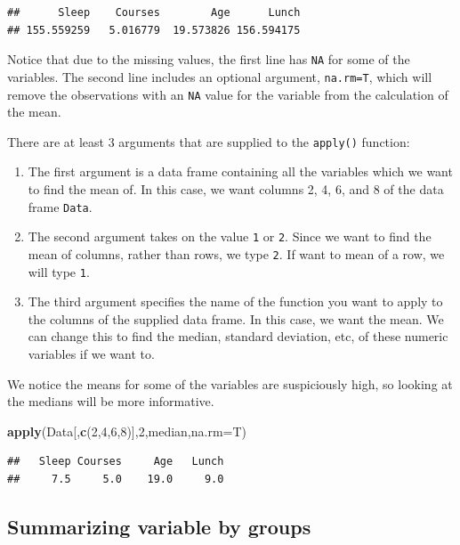 \documentclass[
]{book}
\newenvironment{Shaded}{\begin{snugshade}}{\end{snugshade}}
\newcommand{\AttributeTok}[1]{\textcolor[rgb]{0.13,0.29,0.53}{#1}}
\newcommand{\DecValTok}[1]{\textcolor[rgb]{0.00,0.00,0.81}{#1}}
\newcommand{\FunctionTok}[1]{\textcolor[rgb]{0.13,0.29,0.53}{\textbf{#1}}}
\newcommand{\NormalTok}[1]{#1}
\begin{document}
\begin{verbatim}
##      Sleep    Courses        Age      Lunch 
## 155.559259   5.016779  19.573826 156.594175
\end{verbatim}

Notice that due to the missing values, the first line has \texttt{NA} for some of the variables. The second line includes an optional argument, \texttt{na.rm=T}, which will remove the observations with an \texttt{NA} value for the variable from the calculation of the mean.

There are at least 3 arguments that are supplied to the \texttt{apply()} function:

\begin{enumerate}
\def\labelenumi{\arabic{enumi}.}
\item
  The first argument is a data frame containing all the variables which we want to find the mean of. In this case, we want columns 2, 4, 6, and 8 of the data frame \texttt{Data}.
\item
  The second argument takes on the value \texttt{1} or \texttt{2}. Since we want to find the mean of columns, rather than rows, we type \texttt{2}. If want to mean of a row, we will type \texttt{1}.
\item
  The third argument specifies the name of the function you want to apply to the columns of the supplied data frame. In this case, we want the mean. We can change this to find the median, standard deviation, etc, of these numeric variables if we want to.
\end{enumerate}

We notice the means for some of the variables are suspiciously high, so looking at the medians will be more informative.

\begin{Shaded}
\begin{Highlighting}[]
\FunctionTok{apply}\NormalTok{(Data[,}\FunctionTok{c}\NormalTok{(}\DecValTok{2}\NormalTok{,}\DecValTok{4}\NormalTok{,}\DecValTok{6}\NormalTok{,}\DecValTok{8}\NormalTok{)],}\DecValTok{2}\NormalTok{,median,}\AttributeTok{na.rm=}\NormalTok{T)}
\end{Highlighting}
\end{Shaded}

\begin{verbatim}
##   Sleep Courses     Age   Lunch 
##     7.5     5.0    19.0     9.0
\end{verbatim}

\hypertarget{summarizing-variable-by-groups}{%
\subsection{Summarizing variable by groups}\label{summarizing-variable-by-groups}}
\end{document}
